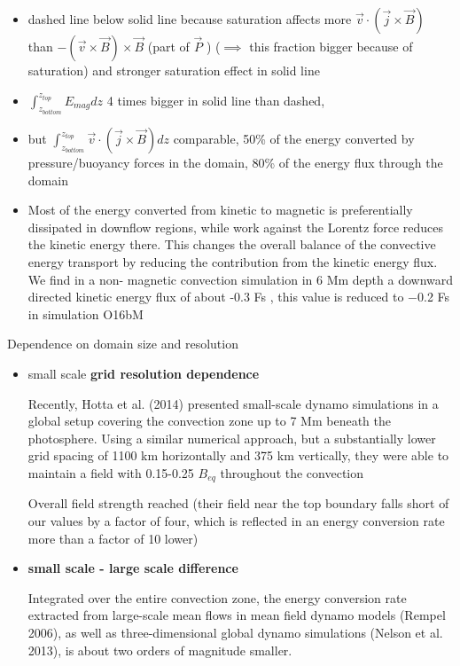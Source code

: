 \documentclass{beamer}
\begin{document}
\begin{frame}
\begin{itemize}
\item dashed line below solid line because saturation affects more $\vec{v} \cdot \left( \vec{j} \times \vec{B} \right)$ than $-(\vec{v} \times \vec{B}) \times \vec{B}$ (part of $\vec{P}$ ) ($\implies$ this fraction bigger because of saturation)
and stronger saturation effect in solid line
\item  $\int_{z_{bottom}}^{z_{top}}{E_{mag} dz}$ 4 times bigger in solid line than dashed, 
\item but $\int_{z_{bottom}}^{z_{top}}{ \vec{v} \cdot \left( \vec{j} \times \vec{B} \right)dz }$ comparable, 50\% of the energy
converted by pressure/buoyancy forces in the domain, 80\% of the
energy flux through the domain
\item Most of
the energy converted from kinetic to magnetic is preferentially
dissipated in downflow regions, while work against the Lorentz
force reduces the kinetic energy there. This changes the overall
balance of the convective energy transport by reducing the
contribution from the kinetic energy flux. We find in a non-
magnetic convection simulation in 6 Mm depth a downward
directed kinetic energy flux of about -0.3 Fs , this value is
reduced to −0.2 Fs in simulation O16bM
\end{itemize}
\end{frame}


\begin{frame}{Dependence on domain size and resolution}
\begin{itemize}
\item small scale {\bf grid resolution dependence}

Recently, Hotta et al. (2014) presented small-scale dynamo
simulations in a global setup covering the convection zone
up to 7 Mm beneath the photosphere. Using a similar numerical
 approach, but a substantially lower grid spacing of
1100 km horizontally and 375 km vertically, they were able to
maintain a field with 0.15-0.25 $B_{eq}$ throughout the convection

Overall field strength reached (their
field near the top boundary falls short of our values by a factor
of four, which is reflected in an energy conversion rate more
than a factor of 10 lower)

\item {\bf small scale - large scale difference}

Integrated over the entire convection
zone, the energy conversion rate
extracted from large-scale mean
flows in mean field dynamo models (Rempel 2006), as well
as three-dimensional global dynamo simulations (Nelson et al.
2013), is about two orders of magnitude smaller.

\end{itemize}

\end{frame}
\end{document}
